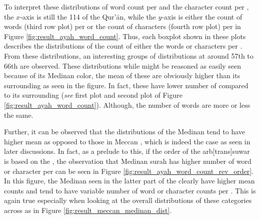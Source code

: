 To interpret these distributions of word count per   and the character count per  , the $x$-axis is still the 114   of the Qur'\=an, while the $y$-axis is either the count of words (third row plot) per   or the count of characters (fourth row plot) per   in Figure \ref{fig:result_ayah_word_count}. Thus, each boxplot shown in these plots describes the distributions of the count of either the words or characters per  . From these distributions, an interesting groups of distributions at around 57th   to 66th   are observed. These distributions while might be reasoned as easily seen because of its Medinan   color, the mean of these are obviously higher than its surrounding   as seen in the figure. In fact, these   have lower number of   compared to its surrounding   (\textit{see} first plot and second plot of Figure \ref{fig:result_ayah_word_count}). Although, the number of words are more or less the same.

Further, it can be observed that the distributions of the Medinan   tend to have higher mean as opposed to those in Meccan  , which is indeed the case as seen in later discussions. In fact, as a prelude to this, if the order of the arb[trans]{suwar}  is based on the  , the observation that Medinan surah has higher number of word or character per   can be seen in Figure \ref{fig:result_ayah_word_count_rev_order}. In this figure, the Medinan   seen in the latter part of the   clearly have higher mean counts and tend to have variable number of word or character counts per  . This is again true especially when looking at the overall distributions of these categories across   as in Figure \ref{fig:result_meccan_medinan_dist}.

